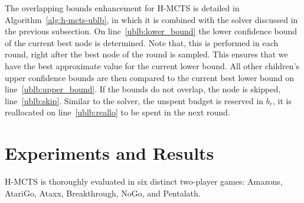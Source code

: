 \documentclass{kecsmstr}
\begin{document}
The overlapping bounds enhancement for H-MCTS is detailed in Algorithm~\ref{alg:h-mcts-ublb}, in which it is combined with the solver discussed in the previous subsection. On line~\ref{ublb:lower_bound} the lower confidence bound of the current best node is determined. Note that, this is performed in each round, right after the best node of the round is sampled. This ensures that we have the best approximate value for the current lower bound. All other children's upper confidence bounds are then compared to the current best lower bound on line~\ref{ublb:upper_bound}. If the bounds do not overlap, the node is skipped, line~\ref{ublb:skip}. Similar to the solver, the unspent budget is reserved in $b_r$, it is reallocated on line~\ref{ublb:reallo} to be spent in the next round.

\chapter{Experiments and Results}
\label{chap:experiments}
\begin{chaptercontents}
H-MCTS is thoroughly evaluated in six distinct two-player games: Amazons, AtariGo, Ataxx, Breakthrough, NoGo, and Pentalath.
\end{chaptercontents}
\end{document}
